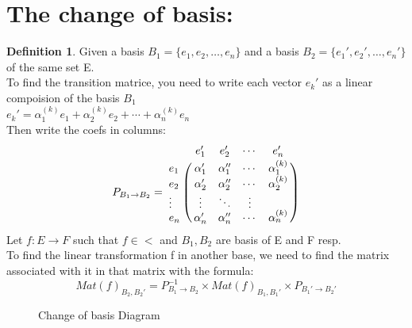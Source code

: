 \documentclass{article}
\theoremstyle{definition}
\newtheorem{definition}[theorem]{Definition}
\theoremstyle{remark}
\numberwithin{equation}{section}
\begin{document}
\section{The change of basis:}

\begin{definition}
    Given a basis \(B_{1} = \{e_{1}, e_{2}, \ldots, e_{n}\}\) and a basis \(B_{2}=\{e_{1}', e_{2}', \dots, e_{n}'\}\) of the same set E.\\
    To find the transition matrice, you need to write each vector $e_k'$ as a linear compoision of the basis $B_1$\\
    \(e_{k}'=\alpha_{1}^{(k)}e_{1}+\alpha_{2}^{(k)}e_{2} + \cdots + \alpha_{n}^{(k)} e_{n}\)\\
    Then write the coefs in columns:
    \[P_{B_{1} \to B_{2}} = 
        \bordermatrix{
            ~ & e_1' & e_2' & \cdots & e_n' \cr
            e_1 & \alpha_{1}' & \alpha_{1}'' & \cdots & \alpha_{1}^{(k)} \cr
            e_2 & \alpha_{2}' & \alpha_{2}'' & \cdots & \alpha_{2}^{(k)} \cr
            \vdots & \vdots & \ddots & \vdots \cr
            e_n & \alpha_{n}' & \alpha_{n}'' & \cdots & \alpha_{n}^{(k)}
        }
    \]
    Let \(f : E \to F\) such that \(f \in \lt \) and \(B_{1}, B_{2}\) are basis of E and F resp.\\
    To find the linear transformation f in another base, we need to find the matrix associated with it in that matrix with the formula:
    \[{Mat(f)}_{B_{2}, B_{2}'} = P^{-1}_{B_{1} \to B_{2}} \times {Mat(f)}_{B_{1}, B_{1}'} \times P_{B_{1}' \to B_{2}'}\]
\end{definition}


\begin{figure}[H]
    \begin{center}
    \end{center}
    \caption{Change of basis Diagram}
\end{figure}
\end{document}
